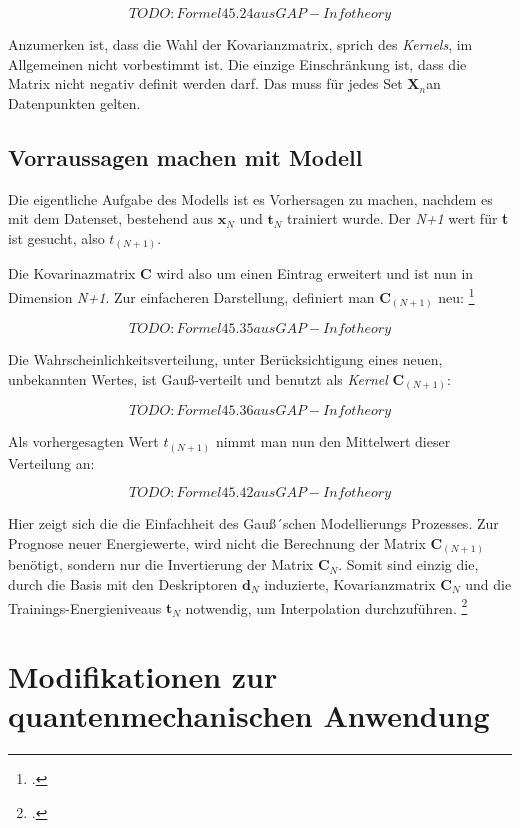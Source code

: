 $$TODO: Formel 45.24 aus GAP-Info theory$$

Anzumerken ist, dass die Wahl der Kovarianzmatrix, sprich des \textit{Kernels}, im Allgemeinen nicht vorbestimmt ist. Die einzige Einschränkung ist, dass die Matrix nicht negativ definit werden darf. Das muss für jedes Set  $\textbf{X}_n$an Datenpunkten gelten. 





\subsection{Vorraussagen machen mit Modell}

Die eigentliche Aufgabe des Modells ist es Vorhersagen zu machen, nachdem es mit dem Datenset, bestehend aus $\textbf{x}_N$ und $\textbf{t}_N$ trainiert wurde. Der \textit{N+1} wert für \textbf{t} ist gesucht, also $t_(N+1)$. 

Die Kovarinazmatrix \textbf{C} wird also um einen Eintrag erweitert und ist nun in Dimension \textit{N+1}. Zur einfacheren Darstellung, definiert man $\textbf{C}_(N+1)$ neu: \footcite[543]{GAP-info-theory}


$$TODO: Formel 45.35 aus GAP-Info theory$$


Die Wahrscheinlichkeitsverteilung, unter Berücksichtigung eines neuen, unbekannten Wertes, ist Gauß-verteilt und benutzt als \textit{Kernel} $\textbf{C}_(N+1)$: 

$$TODO: Formel 45.36 aus GAP-Info theory$$


Als vorhergesagten Wert $\textit{t}_(N+1)$ nimmt man nun den Mittelwert dieser Verteilung an: 


$$TODO: Formel 45.42 aus GAP-Info theory$$

Hier zeigt sich die die Einfachheit des Gauß´schen Modellierungs Prozesses. Zur Prognose neuer Energiewerte, wird nicht die Berechnung der Matrix $\textbf{C}_(N+1)$ benötigt, sondern nur die Invertierung der Matrix $\textbf{C}_N$. Somit sind einzig die, durch die Basis mit den Deskriptoren $\textbf{d}_N$ induzierte, Kovarianzmatrix  $\textbf{C}_N$ und die Trainings-Energieniveaus $\textbf{t}_N$ notwendig, um Interpolation durchzuführen.  \footcite[1052]{GAP-intro}





\section{Modifikationen zur quantenmechanischen Anwendung}


